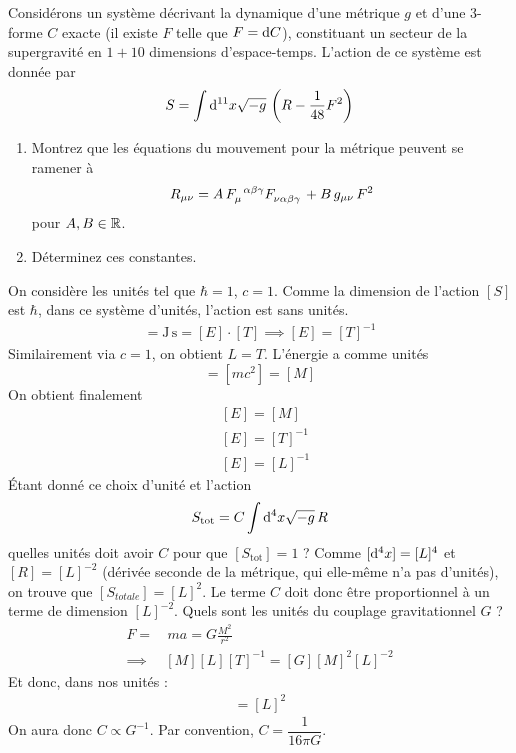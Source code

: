 \begin{exerc}
    Considérons un système décrivant la dynamique d'une métrique $g$ et d'une 3-forme $C$ exacte (il existe $F$ telle que $F = \mathrm{d} C$), constituant un secteur de la supergravité en $1+10$ dimensions d'espace-temps. L'action de ce système est donnée par 
    \begin{align}
        S = \int \mathrm{d}^{11}x \sqrt{-g} \, \left( R - \frac{1}{48}F^2 \right)
    \end{align}
    \begin{enumerate}[label = (\roman*).]
        \item Montrez que les équations du mouvement pour la métrique peuvent se ramener à 
        \begin{align}
            R_{\mu\nu} = A \, F\indices{_\mu^{\alpha\beta \gamma}} F\indices{_{\nu\alpha\beta\gamma}} + B\,  g_{\mu\nu} \,F^2
        \end{align}
        pour $A,B \in \mathbb{R}$. 
        \item Déterminez ces constantes.
    \end{enumerate}
\end{exerc}
\cutebreak
\begin{rmk}
    On considère les unités tel que $\hbar = 1$, $c = 1$. Comme la dimension de l'action $[S]$ est $\hbar$, dans ce système d'unités,  l'action est sans unités. 
    \begin{align}
        [\hbar] =  \mathrm{J} \, \mathrm{s} = [E] \cdot [T] \implies [E] = [T]^{-1}
    \end{align}
    Similairement via $c = 1$, on obtient $L = T$. L'énergie a comme unités
    \begin{equation}
        [E] = [mc^2] = [M]
    \end{equation}
    On obtient finalement
    \begin{align}
        &[E] = [M]\\
        &[E] = [T]^{-1}\\
        &[E] = [L]^{-1}
    \end{align}
    Étant donné ce choix d'unité et l'action
    \begin{equation}
        S_{\text{tot}} = C \int \mathrm{d}^4 x \sqrt{-g}\, R
    \end{equation}
    quelles unités doit avoir $C$ pour que $[S_\text{tot}] = 1$ ? Comme $[\mathrm{d}^4x] = [L]^4$ et $[R] = [L]^{-2}$ (dérivée seconde de la métrique, qui elle-même n'a pas d'unités), on trouve que $[S_{totale}] = [L]^2$. Le terme $C$ doit donc être proportionnel à un terme de dimension $[L]^{-2}$. Quels sont les unités du couplage gravitationnel $G$ ?
    \begin{align}
        F = & \,ma = G\frac{M^2}{r^2}\\
        \implies &[M][L][T]^{-1} = [G][M]^{2}[L]^{-2}
    \end{align}
    Et donc, dans nos unités :
    \begin{align}
        [G] = [L]^{2}
    \end{align}
    On aura donc $C \propto G^{-1}$. Par convention, $C = \dfrac{1}{16 \pi G}$.
\end{rmk}
